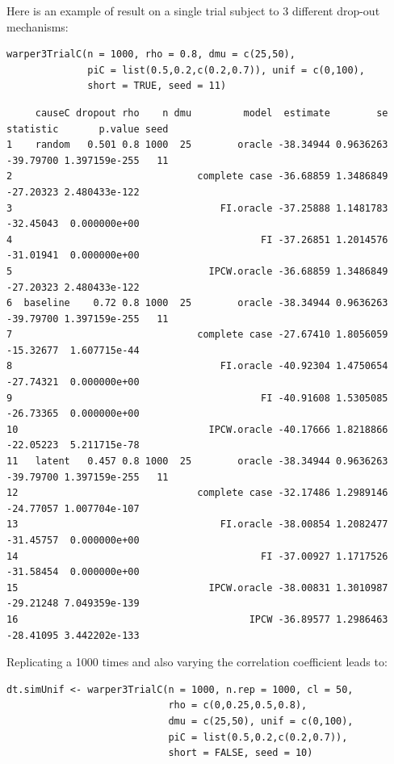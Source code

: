 \documentclass[12pt]{article}
\begin{document}
Here is an example of result on a single trial subject to 3 different
drop-out mechanisms:
\lstset{language=r,label= ,caption= ,captionpos=b,numbers=none}
\begin{lstlisting}
warper3TrialC(n = 1000, rho = 0.8, dmu = c(25,50),
              piC = list(0.5,0.2,c(0.2,0.7)), unif = c(0,100),
              short = TRUE, seed = 11)
\end{lstlisting}

\begin{verbatim}
     causeC dropout rho    n dmu         model  estimate        se statistic       p.value seed
1    random   0.501 0.8 1000  25        oracle -38.34944 0.9636263 -39.79700 1.397159e-255   11
2                                complete case -36.68859 1.3486849 -27.20323 2.480433e-122     
3                                    FI.oracle -37.25888 1.1481783 -32.45043  0.000000e+00     
4                                           FI -37.26851 1.2014576 -31.01941  0.000000e+00     
5                                  IPCW.oracle -36.68859 1.3486849 -27.20323 2.480433e-122     
6  baseline    0.72 0.8 1000  25        oracle -38.34944 0.9636263 -39.79700 1.397159e-255   11
7                                complete case -27.67410 1.8056059 -15.32677  1.607715e-44     
8                                    FI.oracle -40.92304 1.4750654 -27.74321  0.000000e+00     
9                                           FI -40.91608 1.5305085 -26.73365  0.000000e+00     
10                                 IPCW.oracle -40.17666 1.8218866 -22.05223  5.211715e-78     
11   latent   0.457 0.8 1000  25        oracle -38.34944 0.9636263 -39.79700 1.397159e-255   11
12                               complete case -32.17486 1.2989146 -24.77057 1.007704e-107     
13                                   FI.oracle -38.00854 1.2082477 -31.45757  0.000000e+00     
14                                          FI -37.00927 1.1717526 -31.58454  0.000000e+00     
15                                 IPCW.oracle -38.00831 1.3010987 -29.21248 7.049359e-139     
16                                        IPCW -36.89577 1.2986463 -28.41095 3.442202e-133
\end{verbatim}


Replicating a 1000 times and also varying the correlation coefficient leads to:
\lstset{language=r,label= ,caption= ,captionpos=b,numbers=none}
\begin{lstlisting}
dt.simUnif <- warper3TrialC(n = 1000, n.rep = 1000, cl = 50,
                            rho = c(0,0.25,0.5,0.8),
                            dmu = c(25,50), unif = c(0,100),
                            piC = list(0.5,0.2,c(0.2,0.7)), 
                            short = FALSE, seed = 10)
\end{lstlisting}
\end{document}

